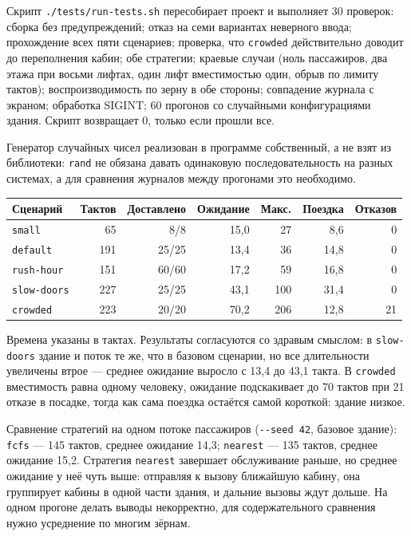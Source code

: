 \documentclass[12pt,a4paper]{article}
\begin{document}
Скрипт \verb|./tests/run-tests.sh| пересобирает проект и выполняет 30
проверок: сборка без предупреждений; отказ на семи вариантах неверного
ввода; прохождение всех пяти сценариев; проверка, что \verb|crowded|
действительно доводит до переполнения кабин; обе стратегии; краевые случаи
(ноль пассажиров, два этажа при восьми лифтах, один лифт вместимостью
один, обрыв по лимиту тактов); воспроизводимость по зерну в обе стороны;
совпадение журнала с экраном; обработка SIGINT; 60 прогонов со случайными
конфигурациями здания. Скрипт возвращает 0, только если прошли все.

Генератор случайных чисел реализован в программе собственный, а не взят из
библиотеки: \verb|rand| не обязана давать одинаковую последовательность на
разных системах, а для сравнения журналов между прогонами это необходимо.

\begin{center}
\begin{tabular}{@{}lrrrrrr@{}}
\textbf{Сценарий} & \textbf{Тактов} & \textbf{Доставлено} &
\textbf{Ожидание} & \textbf{Макс.} & \textbf{Поездка} & \textbf{Отказов} \\
\hline
\verb|small| & 65 & 8/8 & 15,0 & 27 & 8,6 & 0 \\
\verb|default| & 191 & 25/25 & 13,4 & 36 & 14,8 & 0 \\
\verb|rush-hour| & 151 & 60/60 & 17,2 & 59 & 16,8 & 0 \\
\verb|slow-doors| & 227 & 25/25 & 43,1 & 100 & 31,4 & 0 \\
\verb|crowded| & 223 & 20/20 & 70,2 & 206 & 12,8 & 21 \\
\hline
\end{tabular}
\end{center}

Времена указаны в тактах. Результаты согласуются со здравым смыслом: в
\verb|slow-doors| здание и поток те же, что в базовом сценарии, но все
длительности увеличены втрое --- среднее ожидание выросло с 13,4 до 43,1
такта. В \verb|crowded| вместимость равна одному человеку, ожидание
подскакивает до 70 тактов при 21 отказе в посадке, тогда как сама поездка
остаётся самой короткой: здание низкое.

Сравнение стратегий на одном потоке пассажиров (\verb|--seed 42|, базовое
здание): \verb|fcfs| --- 145 тактов, среднее ожидание 14,3;
\verb|nearest| --- 135 тактов, среднее ожидание 15,2. Стратегия
\verb|nearest| завершает обслуживание раньше, но среднее ожидание у неё
чуть выше: отправляя к вызову ближайшую кабину, она группирует кабины в
одной части здания, и дальние вызовы ждут дольше. На одном прогоне делать
выводы некорректно, для содержательного сравнения нужно усреднение по
многим зёрнам.
\end{document}
